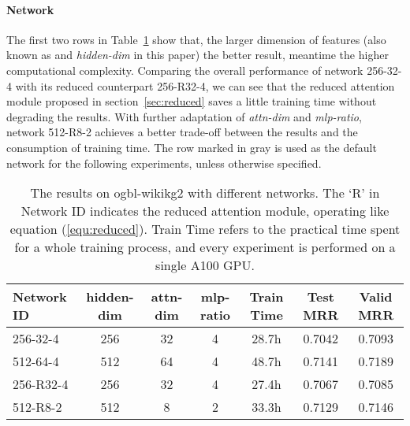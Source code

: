 \documentclass{article}
\begin{document}
\paragraph{Network}
The first two rows in Table~\ref{tab:network} show that, the larger dimension of features (also known as  and \emph{hidden-dim} in this paper) the better result, meantime the higher computational complexity. Comparing the overall performance of network 256-32-4 with its reduced counterpart 256-R32-4, we can see that the reduced attention module proposed in section~\ref{sec:reduced} saves a little training time without degrading the results. With further adaptation of \emph{attn-dim} and \emph{mlp-ratio}, network 512-R8-2 achieves a better trade-off between the results and the consumption of training time.
The row marked in gray is used as the default network for the following experiments, unless otherwise specified.

\begin{table}
 \caption{The results on ogbl-wikikg2 with different networks. The `R' in Network ID indicates the reduced attention module, operating like equation (\ref{equ:reduced}). Train Time refers to the practical time spent for a whole training process, and every experiment is performed on a single A100 GPU.}
 \centering
 \begin{tabular}{l|ccc|ccc}
 \toprule
 Network ID & hidden-dim & attn-dim & mlp-ratio & Train Time & Test MRR & Valid MRR \\
 \midrule
 256-32-4 & 256 & 32 & 4 & 28.7h & 0.7042 & 0.7093 \\
 512-64-4 & 512 & 64 & 4 & 48.7h & 0.7141 & 0.7189 \\
 \midrule
 \rowcolor{gray!30}256-R32-4 & 256 & 32 & 4 & 27.4h & 0.7067 & 0.7085 \\
 512-R8-2 & 512 & 8 & 2 & 33.3h & 0.7129 & 0.7146 \\
 \bottomrule
 \end{tabular}
 \label{tab:network}
\end{table}
\end{document}
